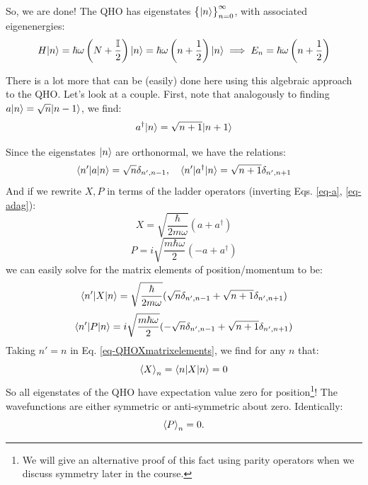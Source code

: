 So, we are done! The QHO has eigenstates $\set{\lvert n \rangle}_{n=0}^\infty$, with associated eigenenergies:
\begin{equation}
    H\lvert n \rangle = \hbar\omega\left(N + \frac{\mathbb{I}}{2}\right)\lvert n \rangle = \hbar\omega\left(n + \frac{1}{2}\right)\lvert n \rangle \implies E_n = \hbar\omega\left(n + \frac{1}{2}\right)
\end{equation}

There is a lot more that can be (easily) done here using this algebraic approach to the QHO. Let's look at a couple. First, note that analogously to finding $a\lvert n \rangle = \sqrt{n}\lvert n-1 \rangle$, we find:
\begin{equation}
    a^\dag\lvert n \rangle = \sqrt{n+1}\lvert n+1 \rangle
\end{equation}

Since the eigenstates $\lvert n \rangle$ are orthonormal, we have the relations:
\begin{equation}
    \langle n' \rvert a\lvert n \rangle = \sqrt{n}\delta_{n', n-1}, \quad \langle n' \rvert a^\dag \lvert n \rangle = \sqrt{n + 1}\delta_{n', n+1}
\end{equation}
And if we rewrite $X, P$ in terms of the ladder operators (inverting Eqs. \eqref{eq-a}, \eqref{eq-adag}):
\begin{equation}
    X = \sqrt{\frac{\hbar}{2m\omega}}(a + a^\dag)
\end{equation}
\begin{equation}
    P = i\sqrt{\frac{m\hbar\omega}{2}}(-a + a^\dag)
\end{equation}
we can easily solve for the matrix elements of position/momentum to be:
\begin{equation}\label{eq-QHOXmatrixelements}
    \langle n' \rvert X\lvert n \rangle = \sqrt{\frac{\hbar}{2m\omega}}(\sqrt{n}\delta_{n', n-1} + \sqrt{n+1}\delta_{n', n+1})
\end{equation}
\begin{equation}
    \langle n' \rvert P\lvert n \rangle = i\sqrt{\frac{m\hbar\omega}{2}}(-\sqrt{n}\delta_{n', n-1} + \sqrt{n+1}\delta_{n', n+1})
\end{equation}
Taking $n' = n$ in Eq. \eqref{eq-QHOXmatrixelements}, we find for any $n$ that:
\begin{equation}
    \left< X \right>_n = \langle n \rvert X\lvert n \rangle = 0
\end{equation}
So all eigenstates of the QHO have expectation value zero for position\footnote{We will give an alternative proof of this fact using parity operators when we discuss symmetry later in the course.}! The wavefunctions are either symmetric or anti-symmetric about zero. Identically:
\begin{equation}
    \left< P \right>_n = 0.
\end{equation}
